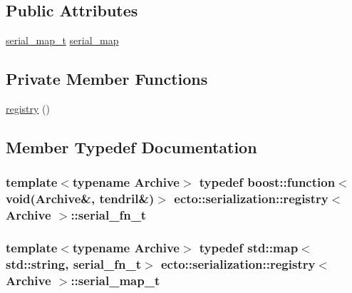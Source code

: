 \subsection*{Public Attributes}
\begin{DoxyCompactItemize}
\item 
\hyperlink{structecto_1_1serialization_1_1registry_a89253dc4749e297b132dacb9e14967c2}{serial\-\_\-map\-\_\-t} \hyperlink{structecto_1_1serialization_1_1registry_a7ef09466a24edc21695e3905c0a7921b}{serial\-\_\-map}
\end{DoxyCompactItemize}
\subsection*{Private Member Functions}
\begin{DoxyCompactItemize}
\item 
\hyperlink{structecto_1_1serialization_1_1registry_acbf5b14a8ef87e8a1324ad852e3e3f13}{registry} ()
\end{DoxyCompactItemize}


\subsection{Member Typedef Documentation}
\hypertarget{structecto_1_1serialization_1_1registry_a9bbc5358e0b5bb519983c16db9c6391b}{
\subsubsection[{serial\-\_\-fn\-\_\-t}]{\setlength{\rightskip}{0pt plus 5cm}template$<$typename Archive$>$ typedef boost\-::function$<$void(Archive\&, {\bf tendril}\&)$>$ {\bf ecto\-::serialization\-::registry}$<$ Archive $>$\-::{\bf serial\-\_\-fn\-\_\-t}}}\label{structecto_1_1serialization_1_1registry_a9bbc5358e0b5bb519983c16db9c6391b}
\hypertarget{structecto_1_1serialization_1_1registry_a89253dc4749e297b132dacb9e14967c2}{
\subsubsection[{serial\-\_\-map\-\_\-t}]{\setlength{\rightskip}{0pt plus 5cm}template$<$typename Archive$>$ typedef std\-::map$<$std\-::string, {\bf serial\-\_\-fn\-\_\-t}$>$ {\bf ecto\-::serialization\-::registry}$<$ Archive $>$\-::{\bf serial\-\_\-map\-\_\-t}}}\label{structecto_1_1serialization_1_1registry_a89253dc4749e297b132dacb9e14967c2}


